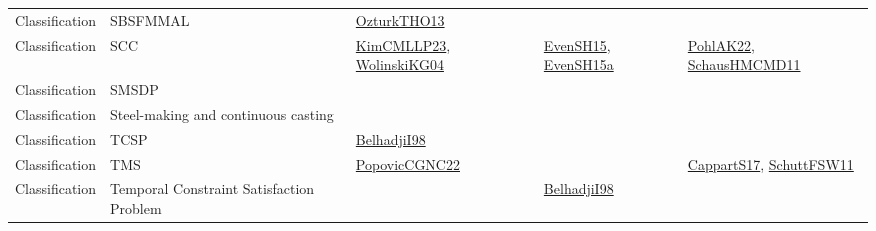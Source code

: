 {\begin{longtable}{lp{3cm}>{\raggedright}p{6cm}>{\raggedright}p{6cm}p{8cm}}
Classification & SBSFMMAL & \href{articles/OzturkTHO13.pdf}{OzturkTHO13}\cite{OzturkTHO13} &  & \\
Classification & SCC & \href{papers/KimCMLLP23.pdf}{KimCMLLP23}\cite{KimCMLLP23}, \href{papers/WolinskiKG04.pdf}{WolinskiKG04}\cite{WolinskiKG04} & \href{papers/EvenSH15.pdf}{EvenSH15}\cite{EvenSH15}, \href{articles/EvenSH15a.pdf}{EvenSH15a}\cite{EvenSH15a} & \href{articles/PohlAK22.pdf}{PohlAK22}\cite{PohlAK22}, \href{articles/SchausHMCMD11.pdf}{SchausHMCMD11}\cite{SchausHMCMD11}\\
Classification & SMSDP &  &  & \\
Classification & Steel-making and continuous casting &  &  & \\
Classification & TCSP & \href{articles/BelhadjiI98.pdf}{BelhadjiI98}\cite{BelhadjiI98} &  & \\
Classification & TMS & \href{papers/PopovicCGNC22.pdf}{PopovicCGNC22}\cite{PopovicCGNC22} &  & \href{papers/CappartS17.pdf}{CappartS17}\cite{CappartS17}, \href{articles/SchuttFSW11.pdf}{SchuttFSW11}\cite{SchuttFSW11}\\
Classification & Temporal Constraint Satisfaction Problem &  & \href{articles/BelhadjiI98.pdf}{BelhadjiI98}\cite{BelhadjiI98} & \\

\end{longtable}}
